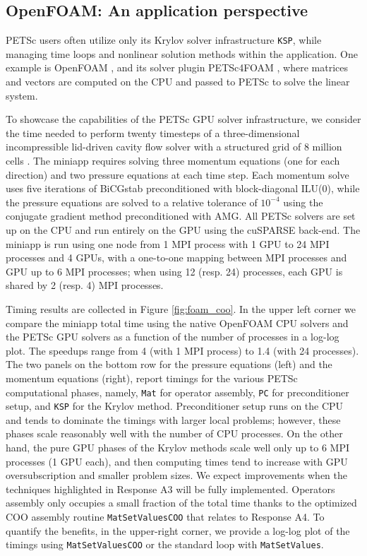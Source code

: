 \documentclass[5p,times]{elsarticle}
\begin{document}
\subsection{OpenFOAM: An application perspective}
\label{subsec:openfoam}

PETSc users often utilize only its
Krylov solver infrastructure {\tt KSP}, while managing time loops and nonlinear
solution methods within the application. One example is OpenFOAM \cite{OPENFOAM}, and its solver plugin PETSc4FOAM \cite{PETSc4FOAM}, where matrices and vectors are computed on the CPU and passed to PETSc to solve the linear system.

To showcase the capabilities of the PETSc GPU solver infrastructure,
we consider
the time needed to perform twenty timesteps of a three-dimensional incompressible
lid-driven cavity flow solver with a structured grid of 8 million cells \cite{OpenFOAMLid}.
The miniapp requires solving three momentum equations (one for each direction) and two pressure equations at each time step. Each
momentum solve uses five iterations of BiCGstab preconditioned with block-diagonal ILU(0), while the pressure equations are solved to a relative tolerance
of $10^{-4}$ using the conjugate gradient method preconditioned with AMG.
All PETSc solvers are set up on the CPU and run
entirely on the GPU using the cuSPARSE back-end.  
The miniapp is run using one node from 1 MPI process with 1 GPU to 24 MPI processes and 4
GPUs, with a one-to-one mapping between MPI processes and GPU up to 6 MPI
processes;
when using 12 (resp. 24) processes, each GPU is shared by 2 (resp. 4)
MPI processes.

Timing results are collected in Figure \ref{fig:foam_coo}. In the upper left
corner we compare the miniapp total time using the native OpenFOAM
CPU solvers and the PETSc GPU solvers as a function of the number of processes in a log-log plot. The speedups
range from 4 (with 1 MPI process) to 1.4 (with 24 processes).
The two panels on the bottom
row for the pressure equations (left) and the momentum equations (right),
report  timings for the various PETSc computational phases,
namely, {\tt Mat} for operator assembly, {\tt PC} for preconditioner setup, and
{\tt KSP} for the Krylov method.
Preconditioner setup runs on the CPU and tends to dominate
the timings with larger local problems; however, these phases scale reasonably
well with the number of CPU processes. On the other hand, the pure GPU phases of
the Krylov methods scale well only up to 6 MPI processes (1 GPU each), and then
computing times tend to increase with GPU oversubscription and smaller problem sizes.
We expect improvements when the techniques highlighted in Response A3 will be fully implemented.
Operators assembly only occupies a small fraction of the
total time thanks to the optimized COO assembly routine {\tt MatSetValuesCOO} that relates to Response A4. To quantify the
benefits, in the upper-right corner, we provide a log-log plot of the timings using {\tt MatSetValuesCOO}
or the standard loop with {\tt MatSetValues}.
\end{document}
